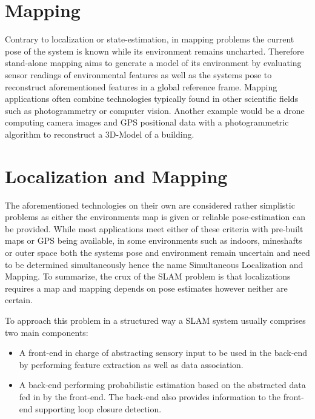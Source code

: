 \section{Mapping}
Contrary to localization or state-estimation, in mapping problems the current pose of the system is known while its environment remains uncharted.
Therefore stand-alone mapping aims to generate a model of its environment by evaluating sensor readings of environmental features as well as the systems pose to reconstruct aforementioned features in a global reference frame. 
Mapping applications often combine technologies typically found in other scientific fields such as photogrammetry or computer vision.
Another example would be a drone computing camera images and GPS positional data with a photogrammetric algorithm to reconstruct a 3D-Model of a building. 


\section{Localization and Mapping}
The aforementioned technologies on their own are considered rather simplistic problems as either the environments map is given or reliable pose-estimation can be provided. While most applications meet either of these criteria with pre-built maps or GPS being available, in some environments such as indoors, mineshafts or outer space both the systems pose and environment remain uncertain and need to be determined simultaneously hence the name Simultaneous Localization and Mapping. 
To summarize, the crux of the SLAM problem is that localizations requires a map and mapping depends on pose estimates however neither are certain. 


To approach this problem in a structured way a SLAM system usually comprises two main components:
\begin{itemize}
	\item A front-end in charge of abstracting sensory input to be used in the back-end by performing feature extraction as well as data association. 
	\item A back-end performing probabilistic estimation based on the abstracted data fed in by the front-end. The back-end also provides information to the front-end supporting loop closure detection. 
\end{itemize}

